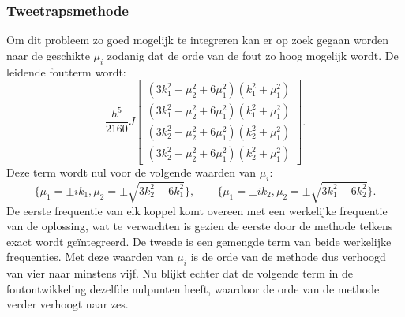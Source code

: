 \documentclass[12pt]{article}
\begin{document}
\subsubsection{Tweetrapsmethode}
Om dit probleem zo goed mogelijk te integreren kan er op zoek gegaan worden naar de geschikte \(\mu_i\) zodanig dat de orde van de fout zo hoog mogelijk wordt. De leidende foutterm wordt:
\begin{equation*}
    \frac{h^5}{2160}J\begin{bmatrix}(3k_1^2-\mu_2^2+6\mu_1^2)(k_1^2+\mu_1^2)\\(3k_1^2-\mu_2^2+6\mu_1^2)(k_1^2+\mu_1^2)\\(3k_2^2-\mu_2^2+6\mu_1^2)(k_2^2+\mu_1^2)\\(3k_2^2-\mu_2^2+6\mu_1^2)(k_2^2+\mu_1^2)\end{bmatrix}.
\end{equation*}
Deze term wordt nul voor de volgende waarden van \(\mu_i\):
\[\Big\{\mu_1=\pm ik_1,\mu_2=\pm\sqrt{3k_2^2-6k_1^2}\Big\},\qquad\Big\{\mu_1=\pm ik_2,\mu_2=\pm\sqrt{3k_1^2-6k_2^2}\Big\}.\]
De eerste frequentie van elk koppel komt overeen met een werkelijke frequentie van de oplossing, wat te verwachten is gezien de eerste door de methode telkens exact wordt geïntegreerd. De tweede is een gemengde term van beide werkelijke frequenties. Met deze waarden van \(\mu_i\) is de orde van de methode dus verhoogd van vier naar minstens vijf. Nu blijkt echter dat de volgende term in de foutontwikkeling dezelfde nulpunten heeft, waardoor de orde van de methode verder verhoogt naar zes. 
\end{document}
